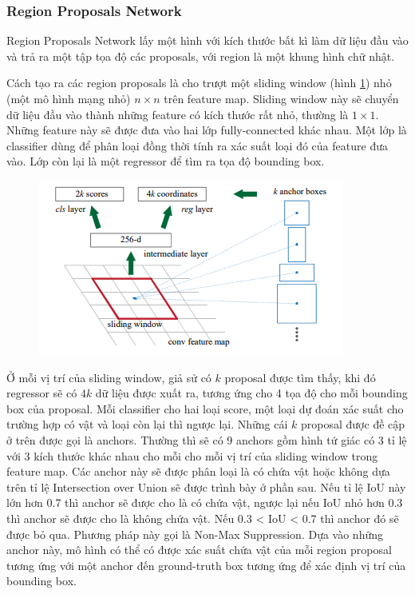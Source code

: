 \subsubsection{Region Proposals Network}
Region Proposals Network lấy một hình với kích thước bất kì làm dữ liệu đầu vào và trả ra một tập tọa độ các proposals, với region là một khung hình chữ nhật.

Cách tạo ra các region proposals là cho trượt một sliding window (hình \ref{chap2:sliding_window}) nhỏ (một mô hình mạng nhỏ) $n \times n$ trên feature map. Sliding window này sẽ chuyển dữ liệu đầu vào thành những feature có kích thước rất nhỏ, thường là $1 \times 1$. Những feature này sẽ được đưa vào hai lớp fully-connected khác nhau. Một lớp là classifier dùng để phân loại đồng thời tính ra xác suất loại đó của feature đưa vào. Lớp còn lại là một regressor để tìm ra tọa độ bounding box.
\begin{center}
	\begin{figure}[H]
	\centering
	\includegraphics[width=0.7\columnwidth]{images/chap2/rpn.png}
    \label{chap2:sliding_window}
	\end{figure}
\end{center}

Ở mỗi vị trí của sliding window, giả sử có $k$ proposal được tìm thấy, khi đó regressor sẽ có $4k$ dữ liệu được xuất ra, tương ứng cho 4 tọa độ cho mỗi bounding box của proposal. Mỗi classifier cho hai loại score, một loại dự đoán xác suất cho trường hợp có vật và loại còn lại thì ngược lại. Những cái $k$ proposal được đề cập ở trên được gọi là anchors. Thường thì sẽ có 9 anchors  gồm hình tứ giác có 3 tỉ lệ với 3 kích thước khác nhau cho mỗi cho mỗi vị trí của sliding window trong feature map. Các anchor này sẽ được phân loại là có chứa vật hoặc không dựa trên tỉ lệ Intersection over Union sẽ được trình bày ở phần sau. Nếu tỉ lệ IoU này lớn hơn 0.7 thì anchor sẽ được cho là có chứa vật, ngược lại nếu IoU nhỏ hơn 0.3 thì anchor sẽ được cho là không chứa vật. Nếu 0.3 < IoU < 0.7 thì anchor đó sẽ được bỏ qua. Phương pháp này gọi là Non-Max Suppression. Dựa vào những anchor này, mô hình có thể có được xác suất chứa vật của mỗi region proposal tương ứng với một anchor đến ground-truth box tương ứng để xác định vị trí của bounding box.


